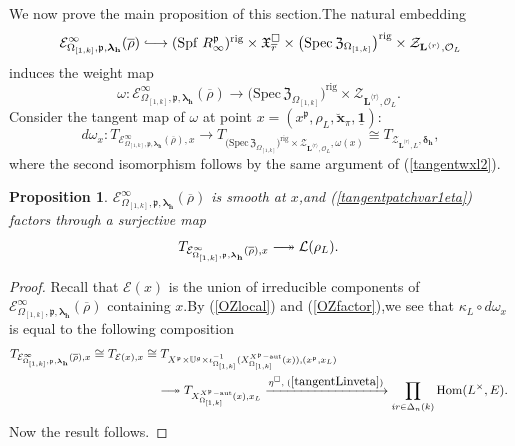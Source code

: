 \documentclass[SecEq,CM,GP]{degruyter-crelle} %
\theoremstyle{plain}
\newtheorem{pro}[thm]{Proposition}
\newcommand{\hooklongrightarrow}{\lhook\joinrel\longrightarrow}
\newcommand{\twoheadlongrightarrow}{\relbar\joinrel\twoheadrightarrow}
\newcommand{\bersteineigenvarpik}{{\mathcal{E}_{\omepik,\fp,\bm{\lambda}_\bh}^\infty(\overline{\rho})}}
\newcommand{\homo}{{\rm Hom}}
\newcommand{\lrr}{{\langle r\rangle}}
\newcommand{\omepik}{\Omega_{[1,k]}}
\newcommand{\rig}{{\rm rig}}
\newcommand{\rigch}{{\mathcal{Z}_{\bL^{\lrr},\mathcal{O}_L}}}
\newcommand{\rigchl}{{\mathcal{Z}_{\bL^{\lrr},L}}}
\newcommand{\Spf}{{\mathrm{Spf}}}
\newcommand{\sbanpik}{{\big(\mathrm{Spec}\hspace{2pt}\mathfrak{Z}_{\omepik}\big)^{\mathrm{rig}}}}
\newcommand{\xfpx}{X^{X^\fp-\mathrm{aut}}_{\omepik}(x)}
\newcommand{\BU}{{\mathbb{U}}}
\newcommand{\bL}{{\mathbf{L}}}
\newcommand{\bh}{{\mathbf{h}}}
\newcommand{\cE}{\mathcal E}
\newcommand{\fp}{{\mathfrak{p}}}
\newcommand{\sL}{\mathcal L}
\begin{document}
We now prove the main proposition of this section.\;The natural embedding $$\bersteineigenvarpik \hooklongrightarrow (\Spf\;R^{\fp}_{\infty})^{\rig}\times\mathfrak{X}_{\overline{r}}^\Box \times \sbanpik\times \rigch$$ induces the weight map 
\begin{equation}
\omega:	\bersteineigenvarpik \longrightarrow \sbanpik\times \rigch.\;
\end{equation}
Consider the tangent map of $\omega$ at point $x=(x^{\fp}, \rho_L, \breve{\mathbf{{x}}}_\pi,\underline{\mathbf{1}})$:
\begin{equation}\label{tangentpatchvar1eta}
d\omega_x:	T_{\bersteineigenvarpik,x} \longrightarrow T_{\sbanpik\times \rigch,\omega(x)}\cong  T_{\rigchl,\bm{\delta}_{\bh}},
\end{equation}
where the second isomorphism  follows by the same argument of (\ref{tangentwxl2}).\;
\begin{pro}\label{coreigentangentmap2}$\bersteineigenvarpik$ is smooth at $x$,\;and (\ref{tangentpatchvar1eta}) factors through a surjective map
\begin{equation}\label{eigentangentmap2}
	T_{\bersteineigenvarpik,x}\twoheadlongrightarrow \sL(\rho_L).\;
\end{equation}
\end{pro}
\begin{proof}Recall that $\cE(x)$ is the union of  irreducible components of $\bersteineigenvarpik$ containing $x$.\;By (\ref{OZlocal}) and (\ref{OZfactor}),\;we see that  $\kappa_L\circ d\omega_x$ is equal to the following composition
\begin{equation}\label{tangentpatchvar1}
	\begin{aligned}
		T_{\bersteineigenvarpik,x}\cong T_{\cE(x),x}
		\cong &\;T_{X^{\fp} \times \BU^g \times \iota_{\omepik}^{-1}(\xfpx),(x^{\fp},x_L)}\\
		&\twoheadlongrightarrow T_{\xfpx,x_L}\xrightarrow{\eta^\Box,\;(\ref{tangentLinveta})}\prod_{ir\in \Delta_n(k)}\homo(L^\times,E).\;
	\end{aligned}
\end{equation}
Now the result follows.\;
\end{proof}
\end{document}
